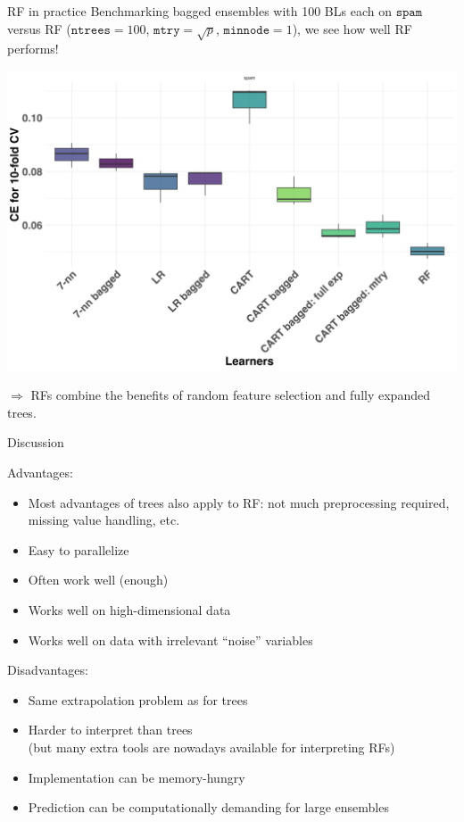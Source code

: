 \documentclass[11pt,compress,t,notes=noshow, xcolor=table]{beamer}
\begin{document}
\begin{frame2}{RF in practice}
\small{
Benchmarking bagged ensembles with 100 BLs each on $\texttt{spam}$
versus RF ($\texttt{ntrees} = 100$, $\texttt{mtry} = \sqrt{p}$, $\texttt{minnode} = 1$),
we see how well RF performs!
}

\begin{center}
\includegraphics[clip=true, trim={0 35 0 30}, width=0.85\linewidth]{figure/bagging-bench_RF.png}
\end{center}

{\footnotesize $\Rightarrow$ RFs combine the benefits of random feature selection and fully expanded trees.}

\end{frame2}

\begin{frame2}{Discussion}

Advantages:
\begin{itemize}
  \item Most advantages of trees also apply to RF: not much preprocessing required, missing value handling, etc.
  \item Easy to parallelize
  \item Often work well (enough)
  \item Works well on high-dimensional data
  \item Works well on data with irrelevant \enquote{noise} variables
\end{itemize}

\lz

Disadvantages:
\begin{itemize}
  \item Same extrapolation problem as for trees
  \item Harder to interpret than trees \\
    (but many extra tools are nowadays
    available for interpreting RFs)
  \item Implementation can be memory-hungry
  \item Prediction can be computationally demanding for large ensembles
\end{itemize}

\end{frame2}

\endlecture
\end{document}
